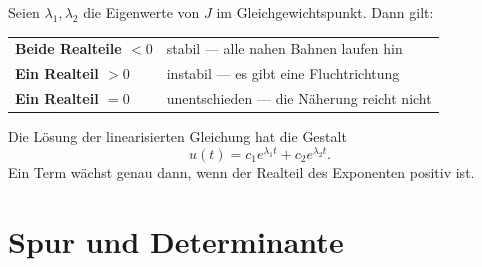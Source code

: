 \begin{merksatz}
Seien $\lambda_1, \lambda_2$ die Eigenwerte von $J$ im Gleichgewichtspunkt. Dann gilt:

\begin{center}
{\small
\renewcommand{\arraystretch}{1.55}
\begin{tabular}{@{}P{3.4cm}P{5.0cm}@{}}
\toprule
\textbf{Beide Realteile $<0$} & \textcolor{gruen}{stabil} --- alle nahen Bahnen laufen hin\\
\textbf{Ein Realteil $>0$} & \textcolor{akzent}{instabil} --- es gibt eine Fluchtrichtung\\
\textbf{Ein Realteil $=0$} & \textcolor{mittel}{unentschieden} --- die Näherung reicht nicht\\
\bottomrule
\end{tabular}}
\end{center}

Die Lösung der linearisierten Gleichung hat die Gestalt
\[ u(t) = c_1e^{\lambda_1 t} + c_2e^{\lambda_2 t} . \]
Ein Term wächst genau dann, wenn der Realteil des Exponenten positiv ist.

\begin{center}
\begin{minipage}{0.88\textwidth}
\end{minipage}
\end{center}
\end{merksatz}

\section{Spur und Determinante}

